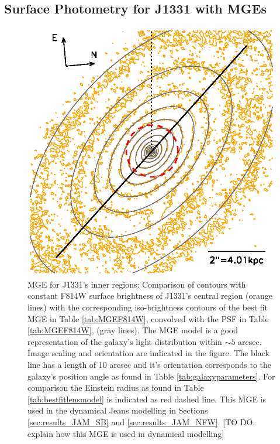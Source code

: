 \subsection{Surface Photometry for J1331 with MGEs} \label{sec:MGE_results}


\begin{figure}
\centering
\includegraphics[width=0.8\columnwidth]{fig/1331F814Wsci_MGE_M.ps}
\caption{MGE for J1331's inner regions: Comparison of contours with constant F814W surface brightness of J1331's central region (orange lines) with the corresponding iso-brightness contours of the best fit MGE in Table \ref{tab:MGEF814W}, convolved with the PSF in Table \ref{tab:MGEF814W}, (gray lines). The MGE model is a good representation of the galaxy's light distribution within $\sim 5$ arcsec. Image scaling and orientation are indicated in the figure. The black line has a length of 10 arcsec and it's orientation corresponds to the galaxy's position angle as found in Table \ref{tab:galaxyparameters}. For comparison the Einstein radius as found in Table \ref{tab:bestfitlensmodel}  is indicated as red dashed line. This MGE is used in the dynamical Jeans modelling in Sections \ref{sec:results_JAM_SB} and \ref{sec:results_JAM_NFW}. [TO DO: explain how this MGE is used in dynamical modelling]}
\label{fig:MGEinnerRegions}
\end{figure}

